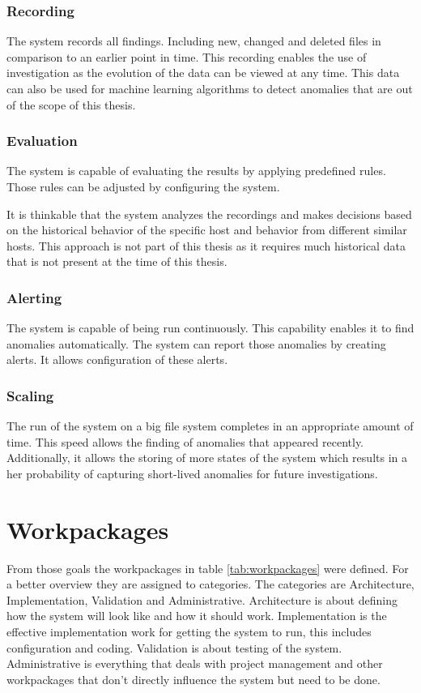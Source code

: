 \documentclass[
	a4paper,					%
	10pt,							%
	twoside,					%
	openright,				%
	notitlepage,			%
	parskip=half,			%
]{scrreprt}					%
\begin{document}
\subsubsection{Recording}
The system records all findings. Including new, changed and deleted files in comparison to an earlier point in time. This recording enables the use of investigation as the evolution of the data can be viewed at any time. This data can also be used for machine learning algorithms to detect anomalies that are out of the scope of this thesis. 

\subsubsection{Evaluation}
The system is capable of evaluating the results by applying predefined rules. Those rules can be adjusted by configuring the system.

It is thinkable that the system analyzes the recordings and makes decisions based on the historical behavior of the specific host and behavior from different similar hosts. This approach is not part of this thesis as it requires much historical data that is not present at the time of this thesis. 

\subsubsection{Alerting}
The system is capable of being run continuously. This capability enables it to find anomalies automatically. The system can report those anomalies by creating alerts. It allows configuration of these alerts.

\subsubsection{Scaling}
The run of the system on a big file system completes in an appropriate amount of time. This speed allows the finding of anomalies that appeared recently. Additionally, it allows the storing of more states of the system which results in a her probability of capturing short-lived anomalies for future investigations. 

\section{Workpackages}

From those goals the workpackages in table \ref{tab:workpackages} were defined. For a better overview they are assigned to categories. The categories are Architecture, Implementation, Validation and Administrative. Architecture is about defining how the system will look like and how it should work. Implementation is the effective implementation work for getting the system to run, this includes configuration and coding. Validation is about testing of the system. Administrative is everything that deals with project management and other workpackages that don't directly influence the system but need to be done.
\end{document}
